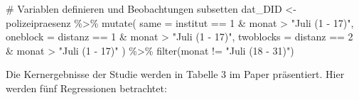 \documentclass[
  a4paper,
  DIV=11,
  oneside]{scrreprt}
\newenvironment{Shaded}{\begin{snugshade}}{\end{snugshade}}
\newcommand{\AttributeTok}[1]{\textcolor[rgb]{0.40,0.45,0.13}{#1}}
\newcommand{\CommentTok}[1]{\textcolor[rgb]{0.37,0.37,0.37}{#1}}
\newcommand{\DecValTok}[1]{\textcolor[rgb]{0.68,0.00,0.00}{#1}}
\newcommand{\FunctionTok}[1]{\textcolor[rgb]{0.28,0.35,0.67}{#1}}
\newcommand{\NormalTok}[1]{\textcolor[rgb]{0.00,0.23,0.31}{#1}}
\newcommand{\OtherTok}[1]{\textcolor[rgb]{0.00,0.23,0.31}{#1}}
\newcommand{\SpecialCharTok}[1]{\textcolor[rgb]{0.37,0.37,0.37}{#1}}
\newcommand{\StringTok}[1]{\textcolor[rgb]{0.13,0.47,0.30}{#1}}
\begin{document}
\begin{Shaded}
\begin{Highlighting}[]
\CommentTok{\# Variablen definieren und Beobachtungen subsetten}
\NormalTok{dat\_DID }\OtherTok{\textless{}{-}}\NormalTok{ polizeipraesenz }\SpecialCharTok{\%\textgreater{}\%}
  \FunctionTok{mutate}\NormalTok{(}
    \AttributeTok{same =}\NormalTok{ institut }\SpecialCharTok{==} \DecValTok{1} \SpecialCharTok{\&}\NormalTok{ monat }\SpecialCharTok{\textgreater{}} \StringTok{"Juli (1 {-} 17)"}\NormalTok{,}
    \AttributeTok{oneblock =}\NormalTok{ distanz }\SpecialCharTok{==} \DecValTok{1} \SpecialCharTok{\&}\NormalTok{  monat }\SpecialCharTok{\textgreater{}} \StringTok{"Juli (1 {-} 17)"}\NormalTok{,}
    \AttributeTok{twoblocks =}\NormalTok{ distanz }\SpecialCharTok{==} \DecValTok{2} \SpecialCharTok{\&}\NormalTok{  monat }\SpecialCharTok{\textgreater{}} \StringTok{"Juli (1 {-} 17)"}
\NormalTok{  ) }\SpecialCharTok{\%\textgreater{}\%} 
  \FunctionTok{filter}\NormalTok{(monat }\SpecialCharTok{!=} \StringTok{"Juli (18 {-} 31)"}\NormalTok{)}
\end{Highlighting}
\end{Shaded}

Die Kernergebnisse der Studie werden in Tabelle 3 im Paper präsentiert.
Hier werden fünf Regressionen betrachtet:
\end{document}
